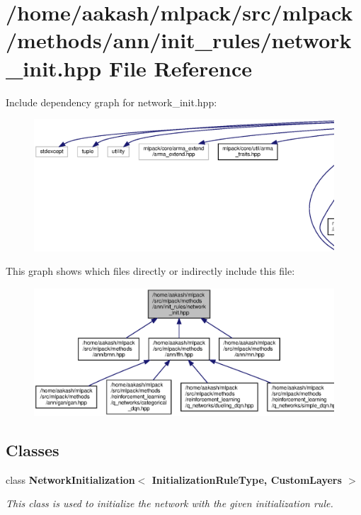 \section{/home/aakash/mlpack/src/mlpack/methods/ann/init\+\_\+rules/network\+\_\+init.hpp File Reference}
\label{network__init_8hpp}
Include dependency graph for network\+\_\+init.\+hpp\+:
\nopagebreak
\begin{figure}[H]
\begin{center}
\leavevmode
\includegraphics[width=350pt]{network__init_8hpp__incl}
\end{center}
\end{figure}
This graph shows which files directly or indirectly include this file\+:
\nopagebreak
\begin{figure}[H]
\begin{center}
\leavevmode
\includegraphics[width=350pt]{network__init_8hpp__dep__incl}
\end{center}
\end{figure}
\subsection*{Classes}
\begin{DoxyCompactItemize}
\item 
class \textbf{ Network\+Initialization$<$ Initialization\+Rule\+Type, Custom\+Layers $>$}
\begin{DoxyCompactList}\small\item\em This class is used to initialize the network with the given initialization rule. \end{DoxyCompactList}\end{DoxyCompactItemize}
